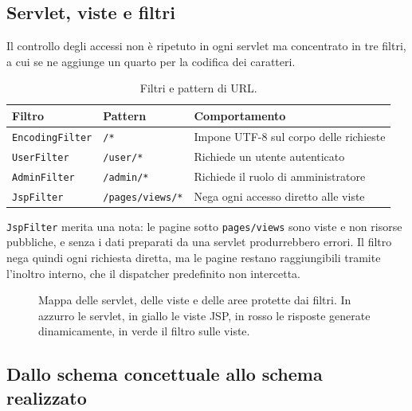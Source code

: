 \documentclass[11pt,a4paper]{article}
\begin{document}
\subsection{Servlet, viste e filtri}

Il controllo degli accessi non è ripetuto in ogni servlet ma concentrato in tre
filtri, a cui se ne aggiunge un quarto per la codifica dei caratteri.

\begin{table}[H]
  \centering
  \small
  \begin{tabular}{llp{6.6cm}}
    \toprule
    \textbf{Filtro} & \textbf{Pattern} & \textbf{Comportamento} \\
    \midrule
    \texttt{EncodingFilter} & \texttt{/*} & Impone UTF-8 sul corpo delle richieste \\
    \texttt{UserFilter} & \texttt{/user/*} & Richiede un utente autenticato \\
    \texttt{AdminFilter} & \texttt{/admin/*} & Richiede il ruolo di amministratore \\
    \texttt{JspFilter} & \texttt{/pages/views/*} & Nega ogni accesso diretto alle viste \\
    \bottomrule
  \end{tabular}
  \caption{Filtri e pattern di URL.}\label{tab:filtri}
\end{table}

\texttt{JspFilter} merita una nota: le pagine sotto \texttt{pages/views} sono
viste e non risorse pubbliche, e senza i dati preparati da una servlet
produrrebbero errori. Il filtro nega quindi ogni richiesta diretta, ma le pagine
restano raggiungibili tramite l'inoltro interno, che il dispatcher predefinito
non intercetta.

\begin{landscape}
\begin{figure}[H]
  \centering
  \resizebox{!}{13.4cm}{\mappaServlet}
  \caption{Mappa delle servlet, delle viste e delle aree protette dai filtri.
           In azzurro le servlet, in giallo le viste JSP, in rosso le risposte
           generate dinamicamente, in verde il filtro sulle viste.}
  \label{fig:servlet}
\end{figure}
\end{landscape}

\subsection{Dallo schema concettuale allo schema realizzato}
\end{document}
